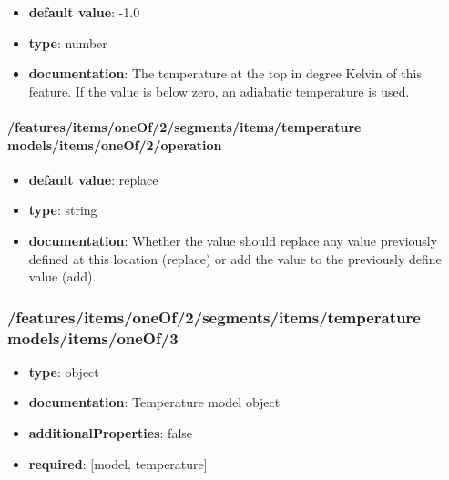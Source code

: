 \begin{itemize}\item {\bf default value}: -1.0
\item {\bf type}: number
\item {\bf documentation}: The temperature at the top in degree Kelvin of this feature. If the value is below zero, an adiabatic temperature is used.
\end{itemize}\paragraph{/features/items/oneOf/2/segments/items/temperature models/items/oneOf/2/operation}
\begin{itemize}\item {\bf default value}: replace
\item {\bf type}: string
\item {\bf documentation}: Whether the value should replace any value previously defined at this location (replace) or add the value to the previously define value (add).
\end{itemize}\subsubsection{/features/items/oneOf/2/segments/items/temperature models/items/oneOf/3}
\begin{itemize}\item {\bf type}: object
\item {\bf documentation}: Temperature model object
\item {\bf additionalProperties}: false
\item {\bf required}: [model, temperature]\end{itemize}
